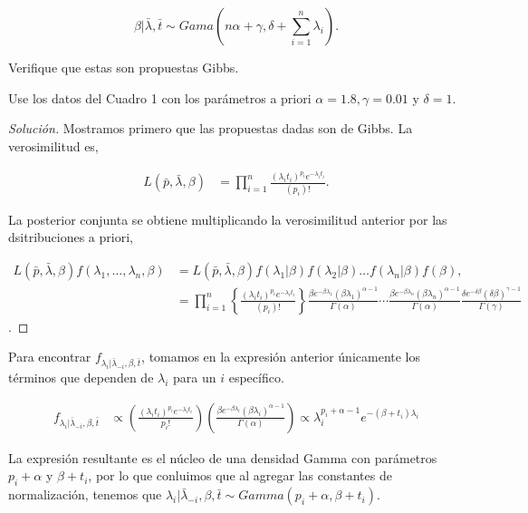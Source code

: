 \documentclass{article}
\begin{document}
\begin{enumerate}
    \[\beta|\bar \lambda, \bar t \sim Gama \left( n\alpha + \gamma , \delta + 
    \sum_{i=1}^n\lambda_i \right).\]
    
    Verifique que estas son propuestas Gibbs.

    Use los datos del Cuadro 1 con los parámetros a priori $\alpha = 1.8, 
    \gamma = 0.01$ y $\delta = 1$.

    \begin{proof}[Solución] 
        Mostramos primero que las propuestas dadas son de Gibbs. La verosimilitud es,

        \begin{align*}
            L(\bar p, \bar\lambda, \beta) &= \prod_{i=1}^n \frac{ (\lambda_i 
            t_i)^{p_i} e^{-\lambda_i t_i} }{(p_i)!}.
        \end{align*}

        La posterior conjunta se obtiene multiplicando la verosimilitud anterior por las
        dsitribuciones a priori,

        \begin{align*}
        L(\bar p, \bar\lambda, \beta)f(\lambda_1,\dots,\lambda_n,\beta) 
        &= L(\bar p,\bar\lambda,\beta)f(\lambda_1|\beta)f(\lambda_2|\beta)\dots f(\lambda_n|\beta)f(\beta),\\
        &= \prod_{i=1}^n \left\{ \frac{ (\lambda_i t_i)^{p_i} e^{-\lambda_i t_i} }{(p_i)!}\right\}
        \frac{\beta e^{-\beta\lambda_1}(\beta\lambda_1)^{\alpha-1}}{\Gamma(\alpha)} \cdots
        \frac{\beta e^{-\beta\lambda_n}(\beta\lambda_n)^{\alpha-1}}{\Gamma(\alpha)}
        \frac{\delta e^{-\delta\beta}(\delta\beta)^{\gamma-1}}{\Gamma(\gamma)}
        \end{align*}.
    \end{proof}

    Para encontrar $f_{\lambda_i|\bar\lambda_{-i},\beta,\bar t}$, tomamos en la expresión
    anterior únicamente los términos que dependen de $\lambda_i$ para un $i$ específico.

    \begin{align*}
        f_{\lambda_i|\bar\lambda_{-i},\beta,\bar t} 
        &\propto \left(\frac{(\lambda_i t_i)^{p_i}e^{-\lambda_i t_i}}{p_i!}\right)
        \left( \frac{\beta e^{-\beta\lambda_i}(\beta\lambda_i)^{\alpha-1}}{\Gamma(\alpha)} \right)
        \propto \lambda_i^{p_i+\alpha-1}e^{-(\beta+t_i)\lambda_i}
    \end{align*}

    La expresión resultante es el núcleo de una densidad Gamma con parámetros $p_i+\alpha$ 
    y $\beta+t_i$, por lo que conluimos que al agregar las constantes de normalización,
    tenemos que $\lambda_i|\bar\lambda_{-i},\beta,\bar t\sim Gamma(p_i+\alpha,\beta+t_i)$.


\end{enumerate}
\end{document}
